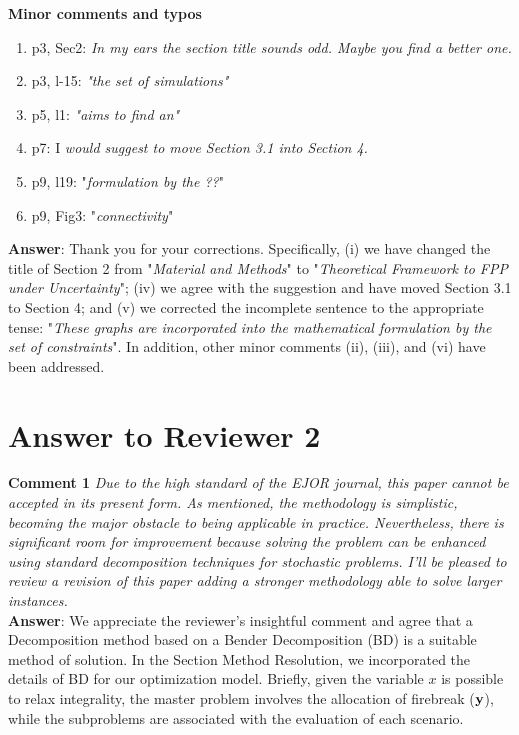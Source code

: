 \documentclass[12pt]{article}
\begin{document}
\noindent \textbf{Minor comments and typos}

\begin{enumerate}
    \item[(i)] p3, Sec2: \textit{In my ears the section title sounds odd. Maybe you find a better one.}
    \item[(ii)] p3, l-15: \textit{"the set of simulations"}
    \item[(iii)] p5, l1: \textit{"aims to find an"}
    \item[(iv)] p7: I \textit{would suggest to move Section 3.1 into Section 4.}
    \item[(v)] p9, l19: "\textit{formulation by the ??}"
    \item[(vi)] p9, Fig3: "\textit{connectivity}"
    \\ 
\end{enumerate}
\textbf{Answer}: Thank you for your corrections. Specifically, (i) we have changed the title of Section 2 from "\textit{Material and Methods}" to "\textit{Theoretical Framework to FPP under Uncertainty}"; (iv) we agree with the suggestion and have moved Section 3.1 to Section 4; and (v) we corrected the incomplete sentence to the appropriate tense: "\textit{These graphs are incorporated into the mathematical formulation by the set of constraints}". In addition, other minor comments (ii), (iii), and (vi) have been addressed.


\newpage
\section*{Answer to Reviewer 2}

\noindent \textbf{Comment 1} \textit{Due to the high standard of the EJOR journal, this paper cannot be accepted in its present form. As mentioned, the methodology is simplistic, becoming the major obstacle to being applicable in practice. Nevertheless, there is significant room for improvement because solving the problem can be enhanced using standard decomposition techniques for stochastic problems. I’ll be pleased to review a revision of this paper adding a stronger methodology able to solve larger instances.}\\

\textbf{Answer}: We appreciate the reviewer's insightful comment and agree that a Decomposition method based on a Bender Decomposition (BD) is a suitable method of solution. In the Section Method Resolution, we incorporated the details of BD for our optimization model. Briefly, given the variable $x$ is possible to relax integrality, the master problem involves the allocation of firebreak ($\bf{y}$), while the subproblems are associated with the evaluation of each scenario. \\
\end{document}
